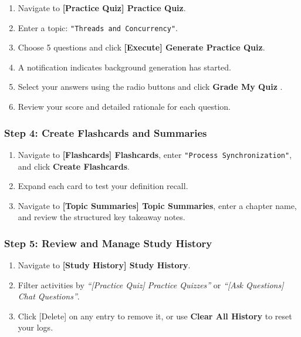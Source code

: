 \documentclass[
]{article}
\providecommand{\tightlist}{%
  \setlength{\itemsep}{0pt}\setlength{\parskip}{0pt}}
\begin{document}
\begin{enumerate}
\def\labelenumi{\arabic{enumi}.}
\tightlist
\item
  Navigate to \textbf{{[}Practice Quiz{]} Practice Quiz}.
\item
  Enter a topic: \texttt{"Threads\ \allowbreak and\ \allowbreak Concurrency"}.
\item
  Choose 5 questions and click \textbf{{[}Execute{]} Generate Practice
  Quiz}.
\item
  A notification indicates background generation has started.
\item
  Select your answers using the radio buttons and click \textbf{Grade My
  Quiz }.
\item
  Review your score and detailed rationale for each question.
\end{enumerate}

\subsubsection{Step 4: Create Flashcards and
Summaries}\label{step-4-create-flashcards-and-summaries}

\begin{enumerate}
\def\labelenumi{\arabic{enumi}.}
\tightlist
\item
  Navigate to \textbf{{[}Flashcards{]} Flashcards}, enter
  \texttt{"Process\ \allowbreak Synchronization"}, and click \textbf{Create
  Flashcards}.
\item
  Expand each card to test your definition recall.
\item
  Navigate to \textbf{{[}Topic Summaries{]} Topic Summaries}, enter a
  chapter name, and review the structured key takeaway notes.
\end{enumerate}

\subsubsection{Step 5: Review and Manage Study
History}\label{step-5-review-and-manage-study-history}

\begin{enumerate}
\def\labelenumi{\arabic{enumi}.}
\tightlist
\item
  Navigate to \textbf{{[}Study History{]} Study History}.
\item
  Filter activities by \emph{``{[}Practice Quiz{]} Practice Quizzes''}
  or \emph{``{[}Ask Questions{]} Chat Questions''}.
\item
  Click {[}Delete{]} on any entry to remove it, or use \textbf{Clear All
  History} to reset your logs.
\end{enumerate}
\end{document}
